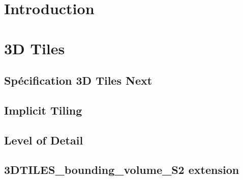 \documentclass[
    TIC, %
    il, %
]{heig-tb}
\begin{document}
\maketitle
\frontmatter
\clearemptydoublepage

\preamble
\authentification

\begin{abstract}
    
\end{abstract}

\clearemptydoublepage
{
    \tableofcontents
    \let\cleardoublepage\clearpage
    \listoffigures
    \let\cleardoublepage\clearpage
}

\printnomenclature
\clearemptydoublepage
{}

\mainmatter


\chapter{Introduction}


\chapter{3D Tiles}

\section{Spécification 3D Tiles Next}
\label{sec:3d-tiles-next}


\newpage
\section{Implicit Tiling}
\label{sec:implicit-tiling}


\newpage
\section{Level of Detail}
\label{sec:lod}


\newpage
\section{3DTILES\_bounding\_volume\_S2 extension}
\label{sec:3DTILES_bv_S2}

\end{document}
